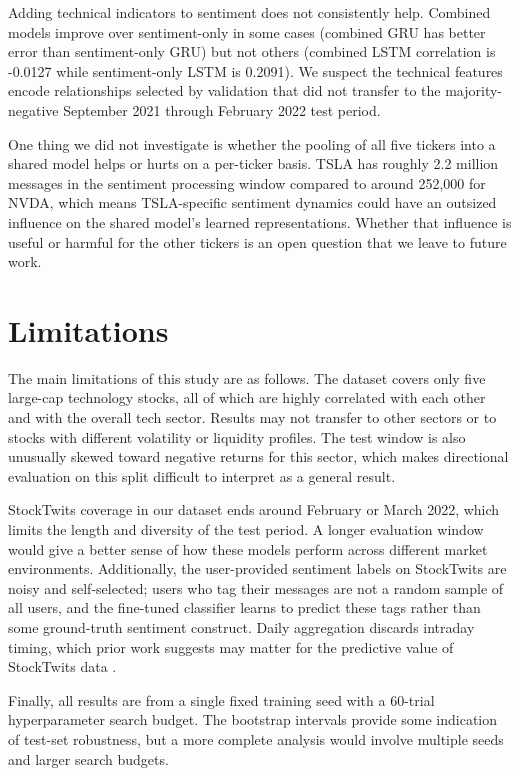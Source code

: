 \documentclass[10pt,twocolumn]{article}
\begin{document}
Adding technical indicators to sentiment does not consistently help. Combined models improve over sentiment-only in some cases (combined GRU has better error than sentiment-only GRU) but not others (combined LSTM correlation is -0.0127 while sentiment-only LSTM is 0.2091). We suspect the technical features encode relationships selected by validation that did not transfer to the majority-negative September 2021 through February 2022 test period.

One thing we did not investigate is whether the pooling of all five tickers into a shared model helps or hurts on a per-ticker basis. TSLA has roughly 2.2 million messages in the sentiment processing window compared to around 252,000 for NVDA, which means TSLA-specific sentiment dynamics could have an outsized influence on the shared model's learned representations. Whether that influence is useful or harmful for the other tickers is an open question that we leave to future work.

\section{Limitations}

The main limitations of this study are as follows. The dataset covers only five large-cap technology stocks, all of which are highly correlated with each other and with the overall tech sector. Results may not transfer to other sectors or to stocks with different volatility or liquidity profiles. The test window is also unusually skewed toward negative returns for this sector, which makes directional evaluation on this split difficult to interpret as a general result.

StockTwits coverage in our dataset ends around February or March 2022, which limits the length and diversity of the test period. A longer evaluation window would give a better sense of how these models perform across different market environments. Additionally, the user-provided sentiment labels on StockTwits are noisy and self-selected; users who tag their messages are not a random sample of all users, and the fine-tuned classifier learns to predict these tags rather than some ground-truth sentiment construct. Daily aggregation discards intraday timing, which prior work suggests may matter for the predictive value of StockTwits data \cite{renault2017intraday}.

Finally, all results are from a single fixed training seed with a 60-trial hyperparameter search budget. The bootstrap intervals provide some indication of test-set robustness, but a more complete analysis would involve multiple seeds and larger search budgets.
\end{document}
